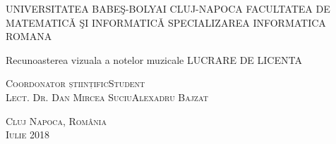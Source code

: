\begin{titlepage}
	\begin{center}
		\vspace{0.5cm}
		\Large \textsc{UNIVERSITATEA BABEŞ-BOLYAI CLUJ-NAPOCA FACULTATEA DE MATEMATICǍ ŞI INFORMATICǍ 
		SPECIALIZAREA INFORMATICA ROMANA }

		\vfill

		\Huge Recunoasterea vizuala a notelor muzicale
		\Large LUCRARE DE LICENTA

		\vfill

		\Large
		\textsc{Coordonator științific}\hfill \textsc{Student}
		\\
		\large
		\textsc{Lect. Dr. Dan Mircea Suciu}\hfill \textsc{Alexadru Bajzat}
	
		\vspace{1.5cm}
		\textsc{Cluj Napoca, România}\\
		\textsc{Iulie 2018}

	\end{center}
\end{titlepage}
 
